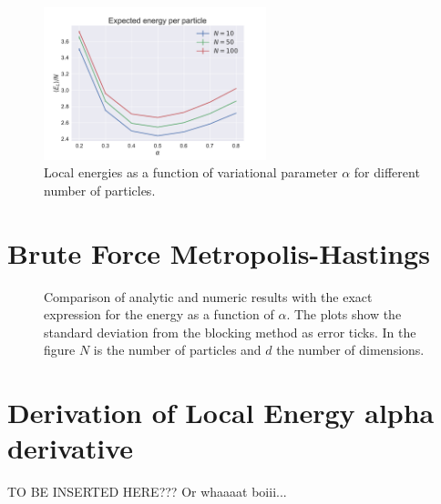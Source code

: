 \documentclass[
    a4paper, aps, twocolumn, floatfix, superscriptaddress, nofootinbib]{revtex4-1}
\newcommand{\1}{\mathds{1}}
\begin{document}
        \begin{figure}
            \includegraphics[width=244px]{../data/figures/problem_e.pdf}
            \caption{Local energies as a function of variational parameter
            $\alpha$ for different number of particles.}
            \label{fig:interacting}
        \end{figure}


\appendix
\section{Brute Force Metropolis-Hastings}

    \begin{figure}
        \caption{Comparison of analytic and numeric results with the exact
        expression for the energy as a function of $\alpha$. The plots show the
        standard deviation from the blocking method as error ticks. In the
        figure $N$ is the number of particles and $d$ the number of dimensions.}
        \label{fig:initial_problem_b}
    \end{figure}

\section{Derivation of Local Energy alpha derivative}

TO BE INSERTED HERE??? Or whaaaat boiii...


\end{document}
